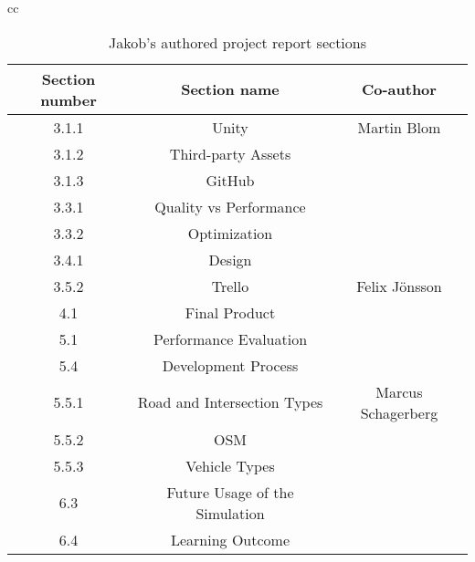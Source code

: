     \begin{table}[ht]
        \centering
        \begin{tabular}{cc}
            \begin{tabular}{|c|c|c|}
                \hline
                \textbf{Section number} & \textbf{Section name} & \textbf{Co-author}
                \\\hline
                
                3.1.1 & Unity & Martin Blom
                \\\hline
                3.1.2 & Third-party Assets & 
                \\\hline
                3.1.3 & GitHub & 
                \\\hline
                3.3.1 & Quality vs Performance & 
                \\\hline
                3.3.2 & Optimization & 
                \\\hline
                3.4.1 & Design & 
                \\\hline
                3.5.2 & Trello & Felix Jönsson
                \\\hline
                4.1 & Final Product & 
                \\\hline
                5.1 & Performance Evaluation & 
                \\\hline
                5.4 & Development Process & 
                \\\hline
                5.5.1 & Road and Intersection Types & Marcus Schagerberg
                \\\hline
                5.5.2 & OSM & 
                \\\hline
                5.5.3 & Vehicle Types &
                \\\hline
                6.3 & Future Usage of the Simulation &
                \\\hline
                6.4 & Learning Outcome &
                
                \\\hline
            \end{tabular}
            
            \\
        \end{tabular}
        \caption{Jakob's authored project report sections}
        \label{Tab:jakob-authored-sections}
    \end{table}